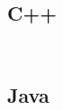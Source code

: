 \subsection{C++}
\begin{lstlisting}[language=C++]
	
\end{lstlisting}



\subsection{Java}
\begin{lstlisting}[language=Java]
	
\end{lstlisting}
